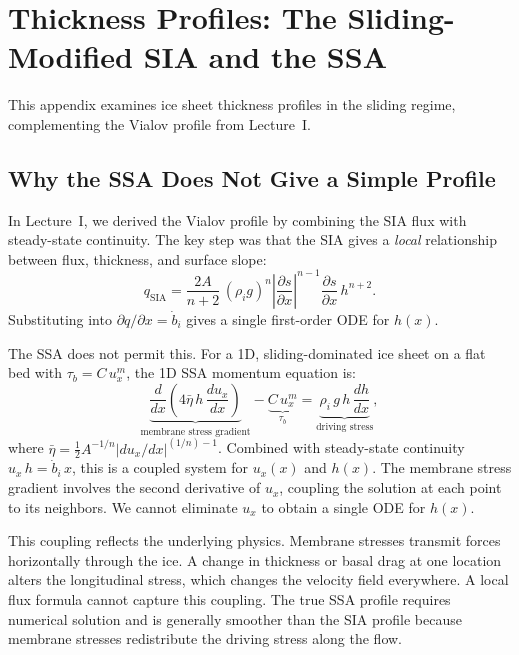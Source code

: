 \documentclass[11pt]{article}
\begin{document}
\section{Thickness Profiles: The Sliding-Modified SIA and the SSA}
\label{app:profiles}

This appendix examines ice sheet thickness profiles in the sliding regime, complementing the Vialov profile from Lecture~I.

\subsection{Why the SSA Does Not Give a Simple Profile}

In Lecture~I, we derived the Vialov profile by combining the SIA flux with steady-state continuity.  The key step was that the SIA gives a \emph{local} relationship between flux, thickness, and surface slope:
\begin{equation}
  q_{\text{SIA}} = \frac{2A}{n+2}\,(\rho_i g)^n\left|\frac{\partial s}{\partial x}\right|^{n-1}\frac{\partial s}{\partial x}\,h^{n+2}.
\end{equation}
Substituting into $\partial q/\partial x = \dot{b}_i$ gives a single first-order ODE for $h(x)$.

\medskip
\noindent The SSA does not permit this.  For a 1D, sliding-dominated ice sheet on a flat bed with $\tau_b = C\,u_x^m$, the 1D SSA momentum equation is:
\begin{equation}
  \underbrace{\frac{d}{dx}\!\left(4\bar{\eta}\,h\,\frac{du_x}{dx}\right)}_{\text{membrane stress gradient}} - \underbrace{C\,u_x^m}_{\tau_b} = \underbrace{\rho_i\,g\,h\,\frac{dh}{dx}}_{\text{driving stress}},
  \label{eq:ssa_1d_grounded_app}
\end{equation}
where $\bar{\eta} = \frac{1}{2}A^{-1/n}|du_x/dx|^{(1/n)-1}$.  Combined with steady-state continuity $u_x\,h = \dot{b}_i\,x$, this is a coupled system for $u_x(x)$ and $h(x)$.  The membrane stress gradient involves the second derivative of $u_x$, coupling the solution at each point to its neighbors.  We cannot eliminate $u_x$ to obtain a single ODE for $h(x)$.

\medskip
\noindent This coupling reflects the underlying physics.  Membrane stresses transmit forces horizontally through the ice.  A change in thickness or basal drag at one location alters the longitudinal stress, which changes the velocity field everywhere.  A local flux formula cannot capture this coupling.  The true SSA profile requires numerical solution and is generally smoother than the SIA profile because membrane stresses redistribute the driving stress along the flow.
\end{document}
